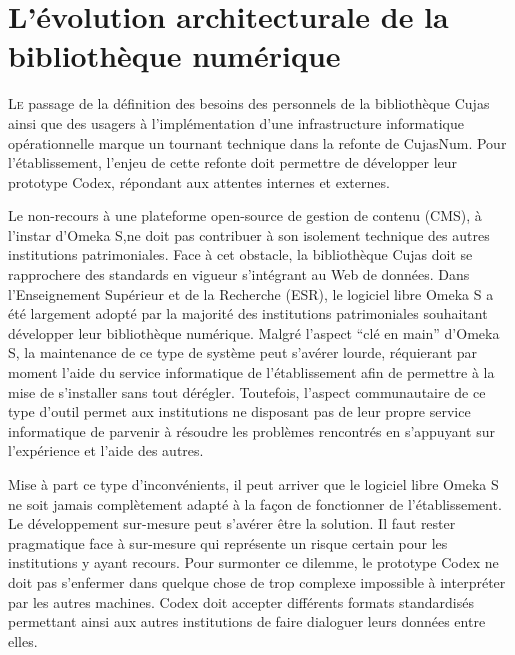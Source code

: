 \chapter[Prototype Codex]{L'évolution architecturale de la bibliothèque numérique}
\lettrine{L}e passage de la définition des besoins des personnels de la bibliothèque Cujas ainsi que des usagers à l'implémentation d'une infrastructure informatique opérationnelle marque un tournant technique dans la refonte de CujasNum. Pour l'établissement, l'enjeu de cette refonte doit permettre de développer leur prototype Codex, répondant aux attentes internes et externes.

Le non-recours à une plateforme open-source de gestion de contenu (CMS), à l'instar d'Omeka S,ne doit pas contribuer à son isolement technique des autres institutions patrimoniales. Face à cet obstacle, la bibliothèque Cujas doit se rapprochere des standards en vigueur s'intégrant au Web de données. Dans l'Enseignement Supérieur et de la Recherche (ESR), le logiciel libre Omeka S a été largement adopté par la majorité des institutions patrimoniales souhaitant développer leur bibliothèque numérique. Malgré l'aspect \enquote{clé en main} d'Omeka S, la maintenance de ce type de système peut s'avérer lourde, réquierant par moment l'aide du service informatique de l'établissement afin de permettre à la mise de s'installer sans tout dérégler. Toutefois, l'aspect communautaire de ce type d'outil permet aux institutions ne disposant pas de leur propre service informatique de parvenir à résoudre les problèmes rencontrés en s'appuyant sur l'expérience et l'aide des autres.

Mise à part ce type d'inconvénients, il peut arriver que le logiciel libre Omeka S ne soit jamais complètement adapté à la façon de fonctionner de l'établissement. Le développement sur-mesure peut s'avérer être la solution. Il faut rester pragmatique face à sur-mesure qui représente un risque certain pour les institutions y ayant recours. Pour surmonter ce dilemme, le prototype Codex ne doit pas s'enfermer dans quelque chose de trop complexe impossible à interpréter par les autres machines. Codex doit accepter différents formats standardisés permettant ainsi aux autres institutions de faire dialoguer leurs données entre elles.


